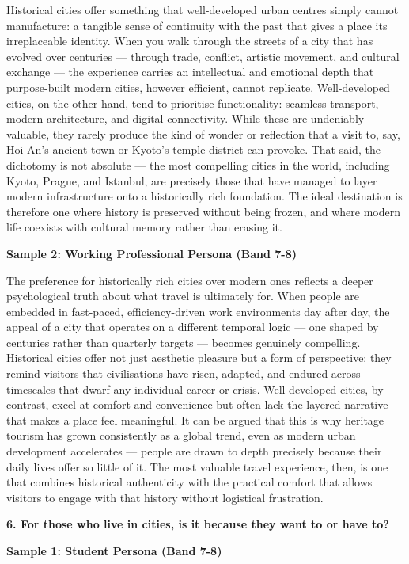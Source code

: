 Historical cities offer something that well-developed urban centres simply cannot manufacture: a tangible sense of continuity with the past that gives a place its irreplaceable identity. When you walk through the streets of a city that has evolved over centuries — through trade, conflict, artistic movement, and cultural exchange — the experience carries an intellectual and emotional depth that purpose-built modern cities, however efficient, cannot replicate. Well-developed cities, on the other hand, tend to prioritise functionality: seamless transport, modern architecture, and digital connectivity. While these are undeniably valuable, they rarely produce the kind of wonder or reflection that a visit to, say, Hoi An's ancient town or Kyoto's temple district can provoke. That said, the dichotomy is not absolute — the most compelling cities in the world, including Kyoto, Prague, and Istanbul, are precisely those that have managed to layer modern infrastructure onto a historically rich foundation. The ideal destination is therefore one where history is preserved without being frozen, and where modern life coexists with cultural memory rather than erasing it.

\textbf{Sample 2: Working Professional Persona (Band 7-8)}

The preference for historically rich cities over modern ones reflects a deeper psychological truth about what travel is ultimately for. When people are embedded in fast-paced, efficiency-driven work environments day after day, the appeal of a city that operates on a different temporal logic — one shaped by centuries rather than quarterly targets — becomes genuinely compelling. Historical cities offer not just aesthetic pleasure but a form of perspective: they remind visitors that civilisations have risen, adapted, and endured across timescales that dwarf any individual career or crisis. Well-developed cities, by contrast, excel at comfort and convenience but often lack the layered narrative that makes a place feel meaningful. It can be argued that this is why heritage tourism has grown consistently as a global trend, even as modern urban development accelerates — people are drawn to depth precisely because their daily lives offer so little of it. The most valuable travel experience, then, is one that combines historical authenticity with the practical comfort that allows visitors to engage with that history without logistical frustration.

\separator

\begin{ieltsquestion}
\textbf{6. For those who live in cities, is it because they want to or have to?}
\end{ieltsquestion}
\textbf{Sample 1: Student Persona (Band 7-8)}


